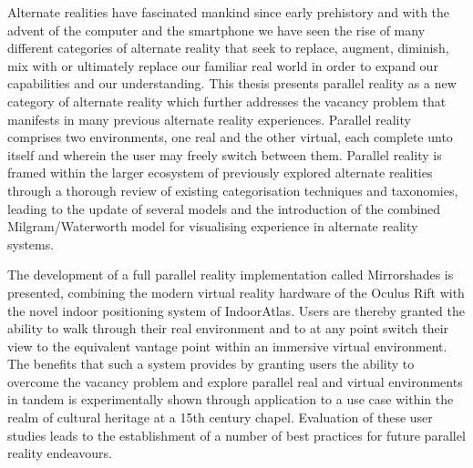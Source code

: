 Alternate realities have fascinated mankind since early prehistory and with the advent of the computer and the smartphone we have seen the rise of many different categories of alternate reality that seek to replace, augment, diminish, mix with or ultimately replace our familiar real world in order to expand our capabilities and our understanding. This thesis presents parallel reality as a new category of alternate reality which further addresses the vacancy problem that manifests in many previous alternate reality experiences. Parallel reality comprises two environments, one real and the other virtual, each complete unto itself and wherein the user may freely switch between them. Parallel reality is framed within the larger ecosystem of previously explored alternate realities through a thorough review of existing categorisation techniques and taxonomies, leading to the update of several models and the introduction of the combined Milgram/Waterworth model for visualising experience in alternate reality systems.

The development of a full parallel reality implementation called Mirrorshades is presented, combining the modern virtual reality hardware of the Oculus Rift with the novel indoor positioning system of IndoorAtlas. Users are thereby granted the ability to walk through their real environment and to at any point switch their view to the equivalent vantage point within an immersive virtual environment. The benefits that such a system provides by granting users the ability to overcome the vacancy problem and explore parallel real and virtual environments in tandem is experimentally shown through application to a use case within the realm of cultural heritage at a 15th century chapel. Evaluation of these user studies leads to the establishment of a number of best practices for future parallel reality endeavours.
